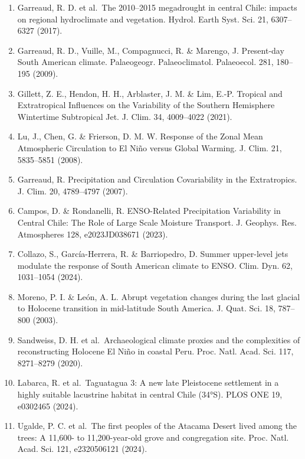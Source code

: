 \documentclass[
]{article}
\begin{document}
\begin{enumerate}
  Orellana, H., Latorre, C., García, J.-L. \& Lambert, F. Spatial
  analysis of paleoclimate variations based on proxy records in the
  south-central Andes (18°- 35° S) from 32 to 4 ka. Quat. Sci. Rev.~313,
  108174 (2023).
\item
  Garreaud, R. D. et al.~The 2010--2015 megadrought in central Chile:
  impacts on regional hydroclimate and vegetation. Hydrol. Earth Syst.
  Sci. 21, 6307--6327 (2017).
\item
  Garreaud, R. D., Vuille, M., Compagnucci, R. \& Marengo, J.
  Present-day South American climate. Palaeogeogr. Palaeoclimatol.
  Palaeoecol. 281, 180--195 (2009).
\item
  Gillett, Z. E., Hendon, H. H., Arblaster, J. M. \& Lim, E.-P. Tropical
  and Extratropical Influences on the Variability of the Southern
  Hemisphere Wintertime Subtropical Jet. J. Clim. 34, 4009--4022 (2021).
\item
  Lu, J., Chen, G. \& Frierson, D. M. W. Response of the Zonal Mean
  Atmospheric Circulation to El Niño versus Global Warming. J. Clim. 21,
  5835--5851 (2008).
\item
  Garreaud, R. Precipitation and Circulation Covariability in the
  Extratropics. J. Clim. 20, 4789--4797 (2007).
\item
  Campos, D. \& Rondanelli, R. ENSO-Related Precipitation Variability in
  Central Chile: The Role of Large Scale Moisture Transport. J. Geophys.
  Res. Atmospheres 128, e2023JD038671 (2023).
\item
  Collazo, S., García-Herrera, R. \& Barriopedro, D. Summer upper-level
  jets modulate the response of South American climate to ENSO. Clim.
  Dyn. 62, 1031--1054 (2024).
\item
  Moreno, P. I. \& León, A. L. Abrupt vegetation changes during the last
  glacial to Holocene transition in mid-latitude South America. J. Quat.
  Sci. 18, 787--800 (2003).
\item
  Sandweiss, D. H. et al.~Archaeological climate proxies and the
  complexities of reconstructing Holocene El Niño in coastal Peru. Proc.
  Natl. Acad. Sci. 117, 8271--8279 (2020).
\item
  Labarca, R. et al.~Taguatagua 3: A new late Pleistocene settlement in
  a highly suitable lacustrine habitat in central Chile (34°S). PLOS ONE
  19, e0302465 (2024).
\item
  Ugalde, P. C. et al.~The first peoples of the Atacama Desert lived
  among the trees: A 11,600- to 11,200-year-old grove and congregation
  site. Proc. Natl. Acad. Sci. 121, e2320506121 (2024).

\end{enumerate}
\end{document}
